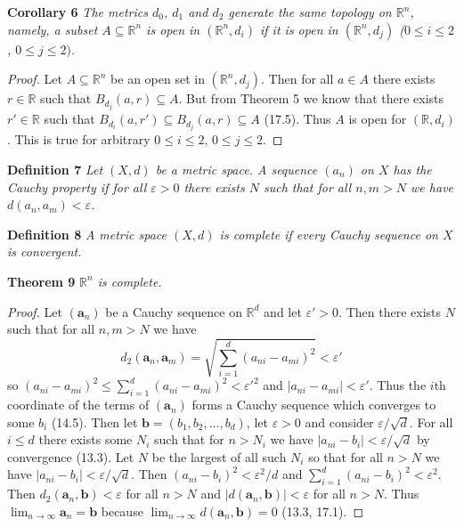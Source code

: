 \documentclass{article}
\begin{document}
\begin{flushleft}
\textbf{Corollary 6}
\textsl{The metrics $d_0$, $d_1$ and $d_2$ generate the same topology on $\mathbb{R}^n$, namely, a subset $A \subseteq \mathbb{R}^n$ is open in $(\mathbb{R}^n, d_i)$ if it is open in $(\mathbb{R}^n, d_j)$ ($0 \leq i \leq 2$, $0 \leq j \leq 2)$.}
\begin{proof}
Let $A \subseteq \mathbb{R}^n$ be an open set in $(\mathbb{R}^n, d_j)$. Then for all $a \in A$ there exists $r \in \mathbb{R}$ such that $B_{d_j}(a,r) \subseteq A$. But from Theorem 5 we know that there exists $r' \in \mathbb{R}$ such that $B_{d_i}(a,r') \subseteq B_{d_j}(a,r) \subseteq A$ (17.5). Thus $A$ is open for $(\mathbb{R}, d_i)$. This is true for arbitrary $0 \leq i \leq 2$, $0 \leq j \leq 2$.
\end{proof}

\textbf{Definition 7}
\textsl{Let $(X,d)$ be a metric space. A sequence $(a_n)$ on $X$ has the Cauchy property if for all $\varepsilon > 0$ there exists $N$ such that for all $n,m > N$ we have $d(a_n,a_m) < \varepsilon$.}\newline

\textbf{Definition 8}
\textsl{A metric space $(X,d)$ is complete if every Cauchy sequence on $X$ is convergent.}\newline

\textbf{Theorem 9}
\textsl{$\mathbb{R}^n$ is complete.}
\begin{proof}
Let $(\mathbf{a}_n)$ be a Cauchy sequence on $\mathbb{R}^d$ and let $\varepsilon' > 0$. Then there exists $N$ such that for all $n,m > N$ we have
\[
d_2(\mathbf{a}_n,\mathbf{a}_m) = \sqrt{\sum_{i=1}^{d} (a_{ni}-a_{mi})^2} < \varepsilon'
\]
so $(a_{ni}-a_{mi})^2 \leq \sum_{i=1}^{d} (a_{ni}-a_{mi})^2 < \varepsilon'^2$ and $|a_{ni}-a_{mi}| < \varepsilon'$. Thus the $i$th coordinate of the terms of $(\mathbf{a}_n)$ forms a Cauchy sequence which converges to some $b_i$ (14.5). Then let $\mathbf{b}=(b_1,b_2, \dots ,b_d)$, let $\varepsilon > 0$ and consider $\varepsilon/\sqrt{d}$. For all $i \leq d$ there exists some $N_i$ such that for $n>N_i$ we have $|a_{ni}-b_{i}| < \varepsilon/\sqrt{d}$ by convergence (13.3). Let $N$ be the largest of all such $N_i$ so that for all $n>N$ we have $|a_{ni}-b_{i}| < \varepsilon/\sqrt{d}$. Then $(a_{ni}-b_{i})^2 < \varepsilon^2/d$ and $\sum_{i=1}^{d} (a_{ni}-b_{i})^2 < \varepsilon^2$. Then $d_2(\mathbf{a}_n,\mathbf{b}) < \varepsilon$ for all $n > N$ and $|d(\mathbf{a}_n, \mathbf{b})| < \varepsilon$ for all $n>N$. Thus $\lim_{n \rightarrow \infty} \mathbf{a}_n = \mathbf{b}$ because $\lim_{n \rightarrow \infty} d(\mathbf{a}_n, \mathbf{b}) = 0$ (13.3, 17.1).
\end{proof}


\end{flushleft}
\end{document}
